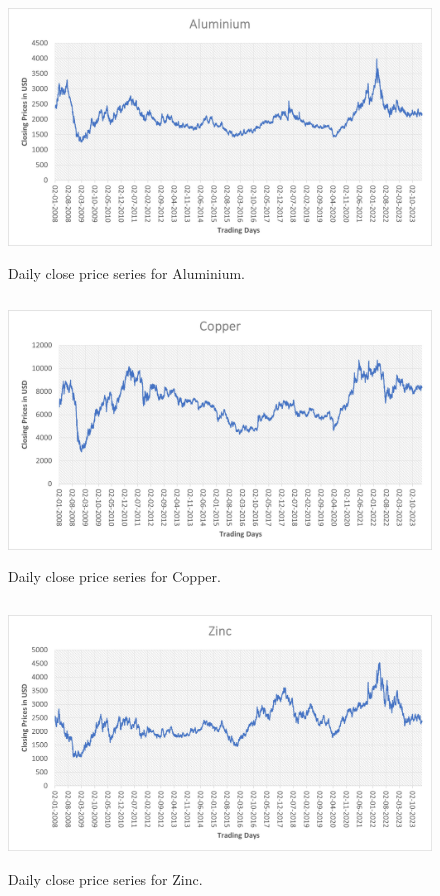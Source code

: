 \documentclass{ws-ijait}
\begin{document}
\begin{center}
	\begin{figure}[!htbp]
		\centering
		\includegraphics[width=13cm, height=7cm]{A.png}
		\caption{Daily close price series for Aluminium.}
		\label{fig:A}
	\end{figure}
\end{center}

\begin{center}
	\begin{figure}[!htbp]
		\centering
		\includegraphics[width=13cm, height=7cm]{Co.png}
		\caption{Daily close price series for Copper.}
		\label{fig:Co}
	\end{figure}
\end{center}

\begin{center}
	\begin{figure}[!htbp]
		\centering
		\includegraphics[width=13cm, height=7cm]{Z.png}
		\caption{Daily close price series for Zinc.}
		\label{fig:Z}
	\end{figure}
\end{center}
\end{document}
